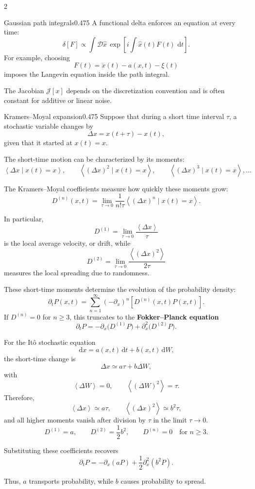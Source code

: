 \documentclass[8pt,a4paper]{extarticle}
\newcommand{\dd}{\,\mathrm d}
\newcommand{\avg}[1]{\left\langle #1\right\rangle}
\begin{document}
\begin{multicols*}{2}
\begin{mytikzbox}{Gaussian path integrals}{0.475}
A functional delta enforces an equation at every time:
\[
\delta[F]
\propto
\int \mathcal{D}\hat{x}\,
\exp\left[
i\int \hat{x}(t)F(t)\,\dd t
\right].
\]
For example, choosing
\[
F(t)=\dot{x}(t)-a(x,t)-\xi(t)
\]
imposes the Langevin equation inside the path integral.

The Jacobian \(\mathcal{J}[x]\) depends on the discretization convention and is
often constant for additive or linear noise.
\end{mytikzbox}

\begin{mytikzbox}{Kramers--Moyal expansion}{0.475}
Suppose that during a short time interval \(\tau\), a stochastic variable changes by
\[
\Delta x=x(t+\tau)-x(t),
\]
given that it started at \(x(t)=x\).

The short-time motion can be characterized by its moments:
\[
\avg{\Delta x\mid x(t)=x},
\qquad
\avg{(\Delta x)^2\mid x(t)=x},
\qquad
\avg{(\Delta x)^3\mid x(t)=x},
\ldots
\]

The Kramers--Moyal coefficients measure how quickly these moments grow:
\[
D^{(n)}(x,t)
=
\lim_{\tau\to0}
\frac{1}{n!\tau}
\avg{(\Delta x)^n\mid x(t)=x}.
\]

In particular,
\[
D^{(1)}
=
\lim_{\tau\to0}\frac{\avg{\Delta x}}{\tau}
\]
is the local average velocity, or drift, while
\[
D^{(2)}
=
\lim_{\tau\to0}\frac{\avg{(\Delta x)^2}}{2\tau}
\]
measures the local spreading due to randomness.

These short-time moments determine the evolution of the probability density:
\[
\partial_tP(x,t)
=
\sum_{n=1}^{\infty}
(-\partial_x)^n
\left[D^{(n)}(x,t)P(x,t)\right].
\]
If \(D^{(n)}=0\) for \(n\geq3\), this truncates to the \textbf{Fokker--Planck equation}
\[
\partial_tP
=
-\partial_x\bigl(D^{(1)}P\bigr)
+
\partial_x^2\bigl(D^{(2)}P\bigr).
\]

For the It\^o stochastic equation
\[
\dd x=a(x,t)\dd t+b(x,t)\dd W,
\]
the short-time change is
\[
\Delta x\simeq a\tau+b\Delta W,
\]
with
\[
\avg{\Delta W}=0,
\qquad
\avg{(\Delta W)^2}=\tau.
\]
Therefore,
\[
\avg{\Delta x}\simeq a\tau,
\qquad
\avg{(\Delta x)^2}\simeq b^2\tau,
\]
and all higher moments vanish after division by \(\tau\) in the limit
\(\tau\to0\).
\[
D^{(1)}=a,
\qquad
D^{(2)}=\frac{1}{2}b^2,
\qquad
D^{(n)}=0
\quad\text{for }n\geq3.
\]

Substituting these coefficients recovers
\[
\partial_tP
=
-\partial_x(aP)
+
\frac{1}{2}\partial_x^2(b^2P).
\]

Thus, \(a\) transports probability, while \(b\) causes probability to spread.


\end{mytikzbox}
\end{multicols*}
\end{document}
